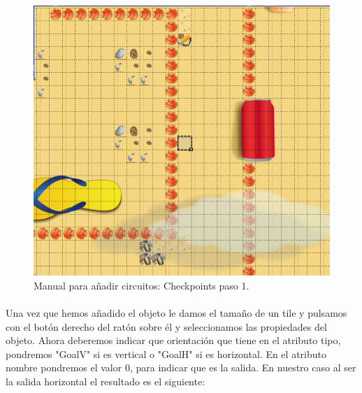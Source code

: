 \begin{figure}[H]
  \label{checkpoints1}
  \begin{center}
    \includegraphics[scale=0.5]{imagenes/manualcircuito/checkpoints1.png}
  \end{center}
  \caption{Manual para añadir circuitos: Checkpoints paso 1.}
\end{figure}

\paragraph{}
Una vez que hemos añadido el objeto le damos el tamaño de un tile y pulsamos con el botón derecho del ratón sobre él y 
seleccionamos las propiedades del objeto. Ahora deberemos indicar que orientación que tiene en el atributo tipo, pondremos "GoalV"
si es vertical o "GoalH" si es horizontal. En el atributo nombre pondremos el valor 0, para indicar que es la salida. En nuestro
caso al ser la salida horizontal el resultado es el siguiente:

